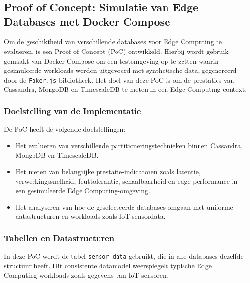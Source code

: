 \chapter{}%
\label{ch:proof-of-concept}

\section{Proof of Concept: Simulatie van Edge Databases met Docker Compose}

Om de geschiktheid van verschillende databases voor Edge Computing te evalueren, is een Proof of Concept (PoC) ontwikkeld. Hierbij wordt gebruik gemaakt van Docker Compose om een testomgeving op te zetten waarin gesimuleerde workloads worden uitgevoerd met synthetische data, gegenereerd door de \texttt{Faker.js}-bibliotheek. Het doel van deze PoC is om de prestaties van Cassandra, MongoDB en TimescaleDB te meten in een Edge Computing-context.

\subsection{Doelstelling van de Implementatie}
De PoC heeft de volgende doelstellingen:
\begin{itemize}
	\item Het evalueren van verschillende partitioneringstechnieken binnen Cassandra, MongoDB en TimescaleDB.
	\item Het meten van belangrijke prestatie-indicatoren zoals latentie, verwerkingssnelheid, fouttolerantie, schaalbaarheid en edge performance in een gesimuleerde Edge Computing-omgeving.
	\item Het analyseren van hoe de geselecteerde databases omgaan met uniforme datastructuren en workloads zoals IoT-sensordata.
\end{itemize}

\subsection{Tabellen en Datastructuren}
In deze PoC wordt de tabel \texttt{sensor\_data} gebruikt, die in alle databases dezelfde structuur heeft. Dit consistente datamodel weerspiegelt typische Edge Computing-workloads zoals gegevens van IoT-sensoren.

